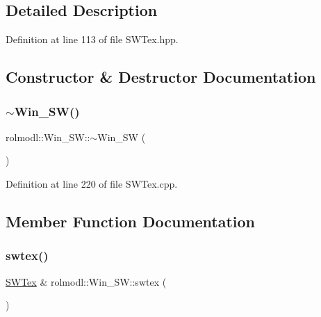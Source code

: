 \subsection{Detailed Description}


Definition at line 113 of file S\+W\+Tex.\+hpp.



\subsection{Constructor \& Destructor Documentation}
\mbox{\label{classrolmodl_1_1_win___s_w_a73d5d5759c4a9e34513d3b719ad6fd43}} 
\subsubsection{\texorpdfstring{$\sim$Win\_SW()}{~Win\_SW()}}
{\footnotesize\ttfamily rolmodl\+::\+Win\+\_\+\+S\+W\+::$\sim$\+Win\+\_\+\+SW (\begin{DoxyParamCaption}{ }\end{DoxyParamCaption})\hspace{0.3cm}{\ttfamily [noexcept]}}



Definition at line 220 of file S\+W\+Tex.\+cpp.



\subsection{Member Function Documentation}
\mbox{\label{classrolmodl_1_1_win___s_w_a0e9cc5aac3ad68a01b450b424cd185cd}} 
\subsubsection{\texorpdfstring{swtex()}{swtex()}}
{\footnotesize\ttfamily \mbox{\hyperlink{classrolmodl_1_1_s_w_tex}{S\+W\+Tex}} \& rolmodl\+::\+Win\+\_\+\+S\+W\+::swtex (\begin{DoxyParamCaption}{ }\end{DoxyParamCaption})}



